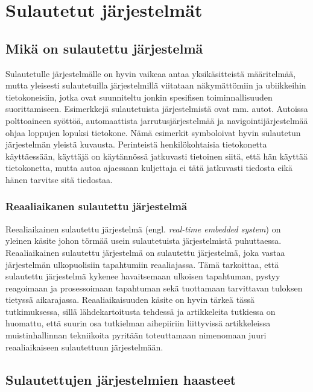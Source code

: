 \chapter{Sulautetut järjestelmät} \label{Kolmas luku}

\section{Mikä on sulautettu järjestelmä}

Sulautetulle järjestelmälle on hyvin vaikeaa antaa yksikäsitteistä määritelmää, mutta yleisesti sulautetuilla järjestelmillä viitataan näkymättömiin ja ubiikkeihin tietokoneisiin, jotka ovat suunniteltu jonkin spesifisen toiminnallisuuden suorittamiseen. Esimerkkejä sulautetuista järjestelmistä ovat mm. autot. Autoissa polttoaineen syöttöä, automaattista jarrutusjärjestelmää ja navigointijärjestelmää ohjaa loppujen lopuksi tietokone.\cite{rtcfes2015book} Nämä esimerkit symboloivat hyvin sulautetun järjestelmän yleistä kuvausta. Perinteistä henkilökohtaisia tietokonetta käyttäessään, käyttäjä on käytännössä jatkuvasti tietoinen siitä, että hän käyttää tietokonetta, mutta autoa ajaessaan kuljettaja ei tätä jatkuvasti tiedosta eikä hänen tarvitse sitä tiedostaa.

\subsection{Reaaliaikanen sulautettu järjestelmä}

Reealiaikainen sulautettu järjestelmä (engl. \textit{real-time embedded system}) on yleinen käsite johon törmää usein sulautetuista järjestelmistä puhuttaessa. Reaaliaikainen sulautettu järjestelmä on sulautettu järjestelmä, joka vastaa järjestelmän ulkopuolisiin tapahtumiin reaaliajassa. Tämä tarkoittaa, että sulautettu järjestelmä kykenee havaitsemaan ulkoisen tapahtuman, pystyy reagoimaan ja prosessoimaan tapahtuman sekä tuottamaan tarvittavan tuloksen tietyssä aikarajassa.\cite{rtcfes2015book} Reaaliaikaisuuden käsite on hyvin tärkeä tässä tutkimuksessa, sillä lähdekartoitusta tehdessä ja artikkeleita tutkiessa on huomattu, että suurin osa tutkielman aihepiiriin liittyvissä artikkeleissa muistinhallinnan tekniikoita pyritään toteuttamaan nimenomaan juuri reaaliaikaiseen sulautettuun järjestelmään.

\section{Sulautettujen järjestelmien haasteet} 

